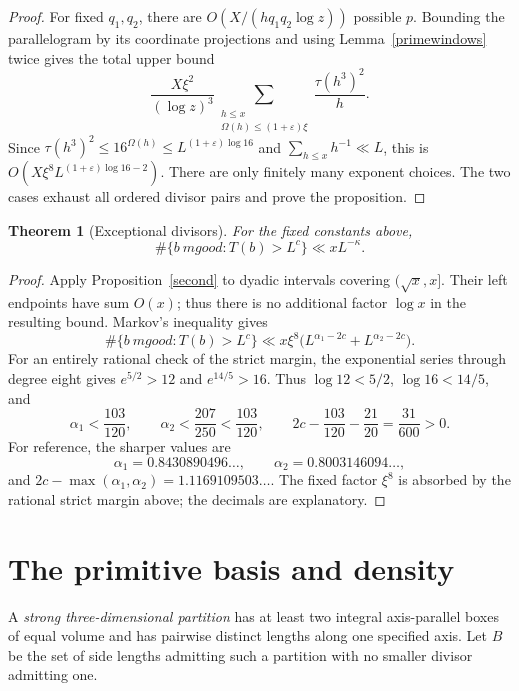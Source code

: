 \documentclass[11pt,a4paper]{article}
\newtheorem{theorem}{Theorem}
\newcommand{\Om}{\Omega}
\begin{document}
\begin{proof}
For fixed $q_1,q_2$, there are
$O(X/(hq_1q_2\log z))$ possible $p$. Bounding the parallelogram
by its coordinate projections and using Lemma~\ref{primewindows}
twice gives the total upper bound
\[
 \frac{X\xi^2}{(\log z)^3}
 \sum_{\substack{h\le x\\\Om(h)\le(1+\varepsilon)\xi}}
       \frac{\tau(h^3)^2}{h}.
\]
Since $\tau(h^3)^2\le16^{\Om(h)}
\le L^{(1+\varepsilon)\log16}$ and
$\sum_{h\le x}h^{-1}\ll L$, this is
$O(X\xi^8 L^{(1+\varepsilon)\log16-2})$.
There are only finitely many exponent choices. The two cases exhaust
all ordered divisor pairs and prove the proposition.
\end{proof}

\begin{theorem}[Exceptional divisors]\label{exceptional}
For the fixed constants above,
\[
 \#\{b\ {
m good}:T(b)>L^c\}\ll xL^{-\kappa}.
\]
\end{theorem}
\begin{proof}
Apply Proposition~\ref{second} to dyadic intervals covering
$(\sqrt x,x]$. Their left endpoints have sum $O(x)$; thus there is
no additional factor $\log x$ in the resulting bound. Markov's
inequality gives
\[
 \#\{b\ {
m good}:T(b)>L^c\}
 \ll x\xi^8\big(L^{\alpha_1-2c}+L^{\alpha_2-2c}\big).
\]
For an entirely rational check of the strict margin, the exponential
series through degree eight gives $e^{5/2}>12$ and $e^{14/5}>16$.
Thus $\log12<5/2$, $\log16<14/5$, and
\[
 \alpha_1<\frac{103}{120},\qquad
 \alpha_2<\frac{207}{250}<\frac{103}{120},\qquad
 2c-\frac{103}{120}-\frac{21}{20}=\frac{31}{600}>0.
\]
For reference, the sharper values are
\[
 \alpha_1=0.8430890496\ldots,\qquad
 \alpha_2=0.8003146094\ldots,
\]
and $2c-\max(\alpha_1,\alpha_2)=1.1169109503\ldots$.
The fixed factor $\xi^8$ is absorbed by the rational strict margin
above; the decimals are explanatory.
\end{proof}

\section{The primitive basis and density}
A \emph{strong three-dimensional partition} has at least two integral
axis-parallel boxes of equal volume and has pairwise distinct lengths
along one specified axis. Let $B$ be the set of side lengths admitting
such a partition with no smaller divisor admitting one.
\end{document}
